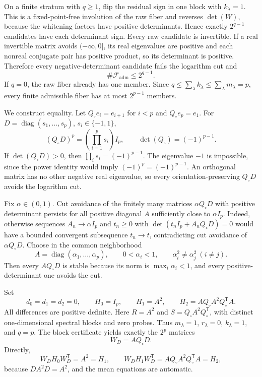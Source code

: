 On a finite stratum with \(q\ge1\), flip the residual sign in one block with \(k_\lambda=1\).  This is a fixed-point-free involution of the raw fiber and reverses \(\det(W)\), because the whitening factors have positive determinants.  Hence exactly \(2^{q-1}\) candidates have each determinant sign.  Every raw candidate is invertible.  If a real invertible matrix avoids \(( -\infty,0]\), its real eigenvalues are positive and each nonreal conjugate pair has positive product, so its determinant is positive.  Therefore every negative-determinant candidate fails the logarithm cut and
\[
 \#\mathcal F_{\mathrm{adm}}\leq2^{q-1}.
\]
If \(q=0\), the raw fiber already has one member.  Since \(q\leq\sum_\lambda k_\lambda\leq\sum_\lambda m_\lambda=p\), every finite admissible fiber has at most \(2^{p-1}\) members.

We construct equality.  Let \(Q_\circ e_i=e_{i+1}\) for \(i<p\) and \(Q_\circ e_p=e_1\).  For \(D=\operatorname{diag}(s_1,\ldots,s_p)\), \(s_i\in\{-1,1\}\),
\[
 (Q_\circ D)^p=\left(\prod_{i=1}^ps_i\right)I_p,\qquad
 \det(Q_\circ)=(-1)^{p-1}.
\]
If \(\det(Q_\circ D)>0\), then \(\prod_i s_i=(-1)^{p-1}\).  The eigenvalue \(-1\) is impossible, since the power identity would imply \((-1)^p=(-1)^{p-1}\).  An orthogonal matrix has no other negative real eigenvalue, so every orientation-preserving \(Q_\circ D\) avoids the logarithm cut.

Fix \(\alpha\in(0,1)\).  Cut avoidance of the finitely many matrices \(\alpha Q_\circ D\) with positive determinant persists for all positive diagonal \(A\) sufficiently close to \(\alpha I_p\).  Indeed, otherwise sequences \(A_n\to\alpha I_p\) and \(t_n\ge0\) with \(\det(t_nI_p+A_nQ_\circ D)=0\) would have a bounded convergent subsequence \(t_n\to t\), contradicting cut avoidance of \(\alpha Q_\circ D\).  Choose in the common neighborhood
\[
 A=\operatorname{diag}(\alpha_1,\ldots,\alpha_p),\qquad
 0<\alpha_i<1,\qquad \alpha_i^2\ne\alpha_j^2\ (i\ne j).
\]
Then every \(AQ_\circ D\) is stable because its norm is \(\max_i\alpha_i<1\), and every positive-determinant one avoids the cut.

Set
\[
 d_0=d_1=d_2=0,\qquad H_0=I_p,\qquad H_1=A^2,\qquad
 H_2=AQ_\circ A^2Q_\circ^{\mathsf T}A.
\]
All differences are positive definite.  Here \(R=A^2\) and \(S=Q_\circ A^2Q_\circ^{\mathsf T}\), with distinct one-dimensional spectral blocks and zero probes.  Thus \(m_\lambda=1\), \(r_\lambda=0\), \(k_\lambda=1\), and \(q=p\).  The block certificate yields exactly the \(2^p\) matrices
\[
 W_D=AQ_\circ D.
\]
Directly,
\[
 W_DH_0W_D^{\mathsf T}=A^2=H_1,\qquad
 W_DH_1W_D^{\mathsf T}=AQ_\circ A^2Q_\circ^{\mathsf T}A=H_2,
\]
because \(DA^2D=A^2\), and the mean equations are automatic.

